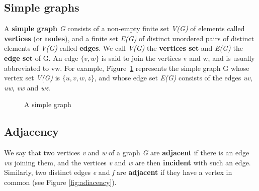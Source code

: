 \subsection{Simple graphs}
A \textbf{simple graph} \textit{G} consists of a non-empty finite set \textit{V(G)} of elements called \textbf{vertices}
(or \textbf{nodes}), and a finite set \textit{E(G)} of distinct unordered pairs of distinct elements of \textit{V(G)}
called \textbf{edges}. We call \textit{V(G)} the \textbf{vertices set} and \textit{E(G)} the \textbf{edge set} of G.
An edge $\{\textit{v}, \textit{w}\}$ is said to join the vertices v and w, and is usually abbreviated to vw. For example, Figure~\ref{fig:simple_graph} represents the simple graph G whose vertex set \textit{V(G)} is $\{\textit{u}, \textit{v}, \textit{w}, \textit{z}\}$, and whose
edge set \textit{E(G)} consists of the edges \textit{uv}, \textit{uw}, \textit{vw} and \textit{wz}. 

\begin{figure}[H]
    \centering
    \caption{A simple graph}
    \label{fig:simple_graph}
\end{figure}

\subsection{Adjacency}
We say that two vertices \textit{v} and \textit{w} of a graph \textit{G} are \textbf{adjacent} if there is an edge \textit{vw} joining them, and the vertices \textit{v} and \textit{w} are then \textbf{incident} with such an edge. \\
Similarly, two distinct edges \textit{e} and \textit{f} are \textbf{adjacent} if they have a vertex in common (see Figure \ref{fig:adiacency}).


